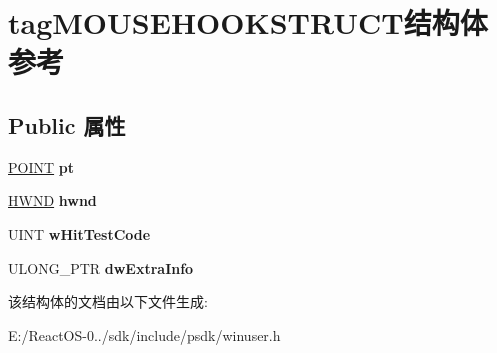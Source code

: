 \hypertarget{structtag_m_o_u_s_e_h_o_o_k_s_t_r_u_c_t}{}\section{tag\+M\+O\+U\+S\+E\+H\+O\+O\+K\+S\+T\+R\+U\+C\+T结构体 参考}
\label{structtag_m_o_u_s_e_h_o_o_k_s_t_r_u_c_t}
\subsection*{Public 属性}
\begin{DoxyCompactItemize}
\item 
\mbox{\label{structtag_m_o_u_s_e_h_o_o_k_s_t_r_u_c_t_aba939a52079e251ee1639f4c8bdfcae2}} 
\hyperlink{structtag_p_o_i_n_t}{P\+O\+I\+NT} {\bfseries pt}
\item 
\mbox{\label{structtag_m_o_u_s_e_h_o_o_k_s_t_r_u_c_t_a21f051bca4c07daf4756426f14e95c96}} 
\hyperlink{interfacevoid}{H\+W\+ND} {\bfseries hwnd}
\item 
\mbox{\label{structtag_m_o_u_s_e_h_o_o_k_s_t_r_u_c_t_a3850910e145e665293c304d443432f44}} 
U\+I\+NT {\bfseries w\+Hit\+Test\+Code}
\item 
\mbox{\label{structtag_m_o_u_s_e_h_o_o_k_s_t_r_u_c_t_aa8ba269c7d60eba53e8c36732f2d34ba}} 
U\+L\+O\+N\+G\+\_\+\+P\+TR {\bfseries dw\+Extra\+Info}
\end{DoxyCompactItemize}


该结构体的文档由以下文件生成\+:\begin{DoxyCompactItemize}
\item 
E\+:/\+React\+O\+S-\/0../sdk/include/psdk/winuser.\+h\end{DoxyCompactItemize}
